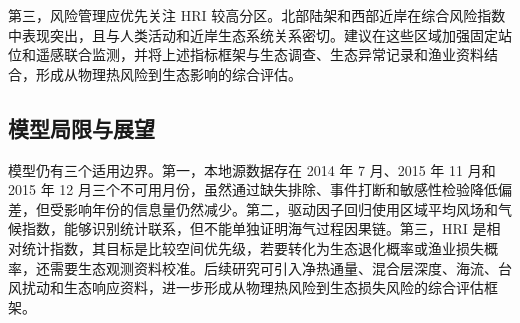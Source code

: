 \documentclass[UTF8,a4paper,zihao=-4,fontset=fandol]{ctexart}
\begin{document}
第三，风险管理应优先关注 HRI 较高分区。北部陆架和西部近岸在综合风险指数中表现突出，且与人类活动和近岸生态系统关系密切。建议在这些区域加强固定站位和遥感联合监测，并将上述指标框架与生态调查、生态异常记录和渔业资料结合，形成从物理热风险到生态影响的综合评估。

\subsection{模型局限与展望}
模型仍有三个适用边界。第一，本地源数据存在 2014 年 7 月、2015 年 11 月和 2015 年 12 月三个不可用月份，虽然通过缺失排除、事件打断和敏感性检验降低偏差，但受影响年份的信息量仍然减少。第二，驱动因子回归使用区域平均风场和气候指数，能够识别统计联系，但不能单独证明海气过程因果链。第三，HRI 是相对统计指数，其目标是比较空间优先级，若要转化为生态退化概率或渔业损失概率，还需要生态观测资料校准。后续研究可引入净热通量、混合层深度、海流、台风扰动和生态响应资料，进一步形成从物理热风险到生态损失风险的综合评估框架。
\end{document}
